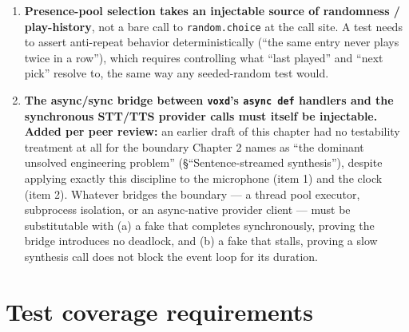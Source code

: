 \documentclass[a4paper,11pt]{report}
\begin{document}
\begin{enumerate}
    it ``exactly'' without also copying the discipline that makes it
    safe: \texttt{Program} has no internal lock and does bare
    \texttt{self.\_state = self.\_state.with\_updates(...)} assignments,
    safe only because \texttt{Program}'s own docstring states something
    upstream serializes every call into one writer. The call state
    machine's actual callers --- turn detection, barge-in detection, and
    sentence-streamed synthesis --- are three independently-running,
    continuous processes (\S``Component overview'') that can race
    exactly the way \S\ref{sec:design-termination} already flags as
    unresolved. Copying \texttt{Program}'s pure-class shape without also
    requiring a single serialized dispatch point (a queue, an actor, or
    an explicit lock at the call boundary) reproduces a data race, not a
    design --- this is a requirement on Chapter 2's orchestration layer,
    not something the pure class or its fake can supply alone.
  \item \textbf{Presence-pool selection takes an injectable source of
    randomness / play-history}, not a bare call to \texttt{random.choice}
    at the call site. A test needs to assert anti-repeat behavior
    deterministically (``the same entry never plays twice in a row''),
    which requires controlling what ``last played'' and ``next pick''
    resolve to, the same way any seeded-random test would.
  \item \textbf{The async/sync bridge between \texttt{voxd}'s
    \texttt{async def} handlers and the synchronous STT/TTS provider
    calls must itself be injectable.} \textbf{Added per peer review:} an
    earlier draft of this chapter had no testability treatment at all
    for the boundary Chapter 2 names as ``the dominant unsolved
    engineering problem'' (\S``Sentence-streamed synthesis''), despite
    applying exactly this discipline to the microphone (item 1) and the
    clock (item 2). Whatever bridges the boundary --- a thread pool
    executor, subprocess isolation, or an async-native provider client
    --- must be substitutable with (a) a fake that completes
    synchronously, proving the bridge introduces no deadlock, and (b) a
    fake that stalls, proving a slow synthesis call does not block the
    event loop for its duration.
\end{enumerate}

\section{Test coverage requirements}
\end{document}
